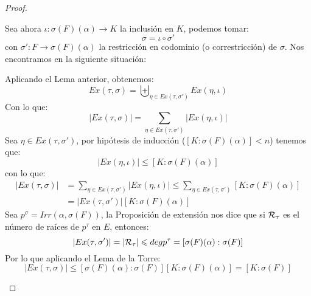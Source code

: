 \begin{prop}
\begin{proof}
\begin{itemize}
                Sea ahora $\iota:\sigma(F)(\alpha)\to K$ la inclusión en $K$, podemos tomar:
                \begin{equation*}
                    \sigma = \iota \circ \sigma'
                \end{equation*}
                con $\sigma':F\to \sigma(F)(\alpha)$ la restricción en codominio (o correstricción) de $\sigma$. Nos encontramos en la siguiente situación:
                \begin{figure}[H]
                    \centering
                \end{figure}
                \noindent
                Aplicando el Lema anterior, obtenemos:
                \begin{equation*}
                    Ex(\tau,\sigma) = \biguplus_{\eta \in Ex(\tau,\sigma')}Ex(\eta, \iota)
                \end{equation*}
                Con lo que:
                \begin{equation*}
                    |Ex(\tau,\sigma)| = \sum_{\eta \in  Ex(\tau, \sigma')}|Ex(\eta,\iota)|
                \end{equation*}
                Sea $\eta\in Ex(\tau,\sigma')$, por hipótesis de inducción ($[K:\sigma(F)(\alpha)]<n$) tenemos que:
                \begin{equation*}
                    |Ex(\eta,\iota)| \leq [K:\sigma(F)(\alpha)]
                \end{equation*}
                con lo que:
                \begin{align*}
                    |Ex(\tau,\sigma)| &= \sum_{\eta\in Ex(\tau,\sigma')}|Ex(\eta,\iota)| \leq \sum_{\eta\in Ex(\tau,\sigma')}[K:\sigma(F)(\alpha)] \\
                                      &= |Ex(\tau,\sigma')|[K:\sigma(F)(\alpha)]
                \end{align*}
                Sea $p^\sigma = Irr(\alpha,\sigma(F))$, la Proposición de extensión nos dice que si $\mathcal{R}_\tau$ es el número de raíces de $p^\tau$ en $E$, entonces:
                \begin{equation*}
                    |Ex(\tau, \sigma')| = |\mathcal{R}_\tau| \leqslant degp^\tau = [\sigma(F)(\alpha):\sigma(F)]
                \end{equation*}
                Por lo que aplicando el Lema de la Torre:
                \begin{equation*}
                    |Ex(\tau,\sigma)|  \leq [\sigma(F)(\alpha):\sigma(F)][K:\sigma(F)(\alpha)] = [K:\sigma(F)]
                \end{equation*}
        \end{itemize}
    \end{proof}
\end{prop}

